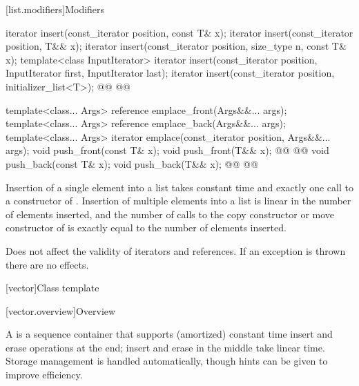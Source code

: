 \documentclass{wg21}
\begin{document}
[list.modifiers]{Modifiers}

%
\begin{itemdecl}
    iterator insert(const_iterator position, const T& x);
    iterator insert(const_iterator position, T&& x);
    iterator insert(const_iterator position, size_type n, const T& x);
    template<class InputIterator>
    iterator insert(const_iterator position, InputIterator first,
    InputIterator last);
    iterator insert(const_iterator position, initializer_list<T>);
    @@
    @@

    template<class... Args> reference emplace_front(Args&&... args);
    template<class... Args> reference emplace_back(Args&&... args);
    template<class... Args> iterator emplace(const_iterator position, Args&&... args);
    void push_front(const T& x);
    void push_front(T&& x);
    @@
    @@
    void push_back(const T& x);
    void push_back(T&& x);
    @@
    @@
\end{itemdecl}

\begin{itemdescr}
    \pnum
    \complexity
    Insertion of a single element into a list takes constant time and
    exactly one call to a constructor of
    . Insertion of multiple elements into a list is linear in the
    number of elements inserted, and the number of calls to the copy
    constructor or move constructor of  is exactly equal
    to the number of elements inserted.

    \pnum
    \remarks
    Does not affect the validity of iterators and references.
    If an exception is thrown there are no effects.
\end{itemdescr}

[vector]{Class template }

[vector.overview]{Overview}

\pnum
{}%
A
is a sequence container that supports
(amortized) constant time insert and erase operations at the end;
insert and erase in the middle take linear time.
Storage management is handled automatically, though hints can be given
to improve efficiency.
\end{document}
